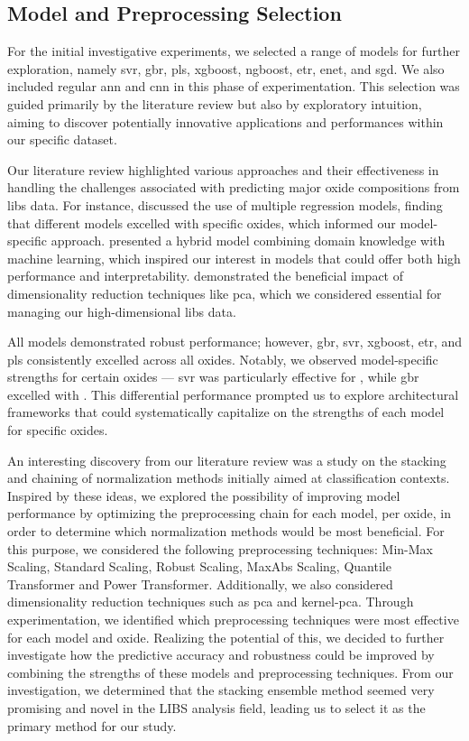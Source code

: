\subsection{Model and Preprocessing Selection}
For the initial investigative experiments, we selected a range of models for further exploration, namely \gls{svr}, \gls{gbr}, \gls{pls}, \gls{xgboost}, \gls{ngboost}, \gls{etr}, \gls{enet}, and \gls{sgd}.
We also included regular \gls{ann} and \gls{cnn} in this phase of experimentation.
This selection was guided primarily by the literature review but also by exploratory intuition, aiming to discover potentially innovative applications and performances within our specific dataset.

Our literature review highlighted various approaches and their effectiveness in handling the challenges associated with predicting major oxide compositions from \gls{libs} data.
For instance, \citet{andersonImprovedAccuracyQuantitative2017} discussed the use of multiple regression models, finding that different models excelled with specific oxides, which informed our model-specific approach.
\citet{song_DF-K-ELM} presented a hybrid model combining domain knowledge with machine learning, which inspired our interest in models that could offer both high performance and interpretability. \citet{rezaei_dimensionality_reduction} demonstrated the beneficial impact of dimensionality reduction techniques like \gls{pca}, which we considered essential for managing our high-dimensional \gls{libs} data.

All models demonstrated robust performance; however, \gls{gbr}, \gls{svr}, \gls{xgboost}, \gls{etr}, and \gls{pls} consistently excelled across all oxides.
Notably, we observed model-specific strengths for certain oxides --- \gls{svr} was particularly effective for , while \gls{gbr} excelled with .
This differential performance prompted us to explore architectural frameworks that could systematically capitalize on the strengths of each model for specific oxides.

An interesting discovery from our literature review was a study on the stacking and chaining of normalization methods initially aimed at classification contexts.
Inspired by these ideas, we explored the possibility of improving model performance by optimizing the preprocessing chain for each model, per oxide, in order to determine which normalization methods would be most beneficial.
For this purpose, we considered the following preprocessing techniques: Min-Max Scaling, Standard Scaling, Robust Scaling, MaxAbs Scaling, Quantile Transformer and Power Transformer.
Additionally, we also considered dimensionality reduction techniques such as \gls{pca} and \gls{kernel-pca}.
Through experimentation, we identified which preprocessing techniques were most effective for each model and oxide.
Realizing the potential of this, we decided to further investigate how the predictive accuracy and robustness could be improved by combining the strengths of these models and preprocessing techniques.
From our investigation, we determined that the stacking ensemble method seemed very promising and novel in the LIBS analysis field, leading us to select it as the primary method for our study.

